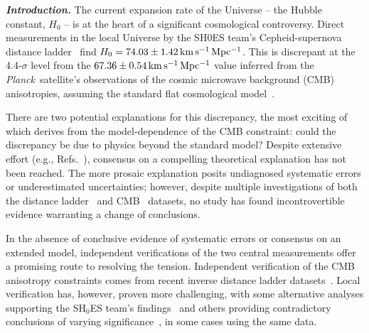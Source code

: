 \documentclass[%
 reprint,
 superscriptaddress,
 nofootinbib,
 amsmath,amssymb,
 aps,
]{revtex4-2}
\newcommand{\hubble}{\ensuremath{H_0}}
\newcommand{\kmsmpc}{\ensuremath{{\rm km\,s^{-1}\,Mpc^{-1}}}}
\newcommand{\planck}{{\it Planck}}
\begin{document}


\textbf{\emph{ Introduction.}} The current expansion rate of the Universe -- the Hubble constant, $H_0$ -- is at the heart of a significant cosmological controversy. Direct measurements in the local Universe by the SH0ES team's Cepheid-supernova distance ladder~\cite{Riess_etal:2019} find $\hubble = 74.03 \pm 1.42 \,\kmsmpc$. This is discrepant at the 4.4-$\sigma$ level from the $67.36 \pm 0.54\,\kmsmpc$ value inferred from the \planck\ satellite's observations of the cosmic microwave background (CMB) anisotropies, assuming the standard flat cosmological model~\cite{Planck_VI:2018}.

There are two potential explanations for this discrepancy, the most exciting of which derives from the model-dependence of the CMB constraint: could the discrepancy be due to physics beyond the standard model? Despite extensive effort
(e.g., Refs.~\cite{Knox_Millea:2020,Vagnozzi:2020}), consensus on a compelling theoretical explanation has not been reached. The more prosaic explanation posits undiagnosed systematic errors or underestimated uncertainties; however, despite multiple investigations of both the distance ladder~\cite{Efstathiou:2014,Rigault_etal:2015,Jones_etal:2015,Cardona_etal:2016,Zhang_etal:2017,Follin_Knox:2017,Feeney_etal:2017,Wu_Huterer:2017,Dhawan_etal:2017,Bengaly_etal:2018,Rigault_etal:2018,Jones_etal:2018,Riess_etal:2020,Efstathiou:2020} and CMB~\cite{Spergel_etal:2015,Addison_etal:2016,Obied_etal:2017,Calabrese_etal:2017,Efstathiou_Gratton:2019,Motloch_Hu:2020,ACT:2020} datasets, no study has found incontrovertible evidence warranting a change of conclusions.

In the absence of conclusive evidence of systematic errors or consensus on an extended model, independent verifications of the two central measurements offer a promising route to resolving the tension. Independent verification of the CMB anisotropy constraints comes from recent inverse distance ladder datasets~\cite{Addison_etal:2017,DES_H_0:2017,Philcox_etal:2020}. Local verification has, however, proven more challenging, with some alternative analyses supporting the SH$_0$ES team's findings~\cite{Yuan_etal:2019,Huang_etal:2020,H0LICOW_XIII:2020,TDCOSMO_I:2020,Pesce_etal:2020} and others providing contradictory conclusions of varying significance~\cite{Freedman_etal:2019,Freedman_etal:2020,TDCOSMO_IV:2020,Boruah_etal:2020}, in some cases using the same data.
\end{document}
